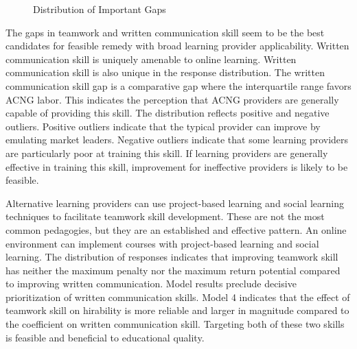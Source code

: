 \begin{figure}[h!]
    \centering
    \caption{Distribution of Important Gaps}
    \label{fig:important_gaps}
\end{figure}

The gaps in teamwork and written communication skill seem to be the best candidates for
feasible remedy with broad learning provider applicability.
Written communication skill is uniquely amenable to online learning.
Written communication skill is also unique in the response distribution.
The written communication skill gap is a comparative gap where the interquartile range favors ACNG labor.
This indicates the perception that ACNG providers are generally capable of providing this skill.
The distribution reflects positive and negative outliers.
Positive outliers indicate that the typical provider can improve by emulating market leaders.
Negative outliers indicate that some learning providers are particularly poor at training this skill.
If learning providers are generally effective in training this skill,
improvement for ineffective providers is likely to be feasible.

Alternative learning providers can use project-based learning and social learning
techniques to facilitate teamwork skill development.
These are not the most common pedagogies, but they are an established and effective pattern.
An online environment can implement courses with project-based learning and social learning.
The distribution of responses indicates that improving teamwork skill has neither the maximum
penalty nor the maximum return potential compared to improving written communication.
Model results preclude decisive prioritization of written communication skills.
Model 4 indicates that the effect of teamwork skill on hirability is more reliable
and larger in magnitude compared to the coefficient on written communication skill.
Targeting both of these two skills is feasible and beneficial to educational quality.

